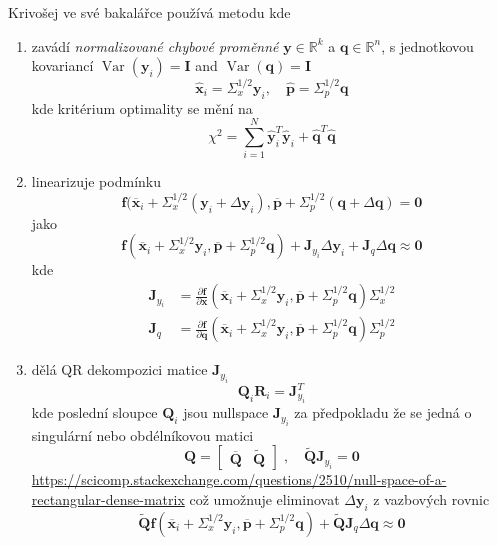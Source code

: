 \documentclass{article}
\begin{document}
	Krivošej ve své bakalářce používá metodu kde
	\begin{enumerate}
		\item zavádí \emph{normalizované chybové proměnné} $\bm{y} \in \mathbb{R}^{k}$ a $\bm{q} \in \mathbb{R}^{n}$, s jednotkovou kovariancí $\operatorname{Var}\left(\bm{y}_{i}\right)=\bm{I}$ and $\operatorname{Var}(\bm{q})=\bm{I}$
		$$
		\hat{\bm{x}}_{i}=\Sigma_{x}^{1 / 2} \bm{y}_{i}, \quad \hat{\bm{p}}=\Sigma_{p}^{1/2} \bm{q}
		$$
		kde kritérium optimality se mění na
		\begin{equation}
			\chi^2 = \sum_{i=1}^N \bm{\hat{y}}_i^T \bm{\hat{y}}_i + \bm{\hat{q}}^T \bm{\hat{q}} 
		\end{equation}
		\item linearizuje podmínku
		\begin{equation}
			\bm{f}(\bm{\overline{x}}_i+\Sigma_{x}^{1/2}(\bm{y}_i+\Delta\bm{y}_i),\bm{\overline{p}}+\Sigma_{p}^{1/2}(\bm{q}+\Delta\bm{q}) = \bm{0}
		\end{equation}
		jako
		\begin{equation}
			\bm{f}(\bm{\overline{x}}_i+\Sigma_{x}^{1/2}\bm{y}_i,\bm{\overline{p}}+\Sigma_{p}^{1/2}\bm{q}) + \bm{J}_{y_i} \Delta\bm{y}_i + \bm{J}_q \Delta\bm{q} \approx \bm{0}
		\end{equation}
		kde
		\begin{align}
			\bm{J}_{y_i} &= \frac{\partial\bm{f}}{\partial\bm{x}}(\bm{\overline{x}}_i+\Sigma_{x}^{1/2}\bm{y}_i,\bm{\overline{p}}+\Sigma_{p}^{1/2}\bm{q}) \Sigma_{x}^{1/2} \\
			\bm{J}_q &= \frac{\partial\bm{f}}{\partial\bm{q}}(\bm{\overline{x}}_i+\Sigma_{x}^{1/2}\bm{y}_i,\bm{\overline{p}}+\Sigma_{p}^{1/2}\bm{q}) \Sigma_{p}^{1/2}
		\end{align}
		\item dělá QR dekompozici matice $\bm{J}_{y_i}$
		\begin{equation}
			\bm{Q}_i \bm{R}_i = \bm{J}_{y_i}^T
		\end{equation}
		kde poslední sloupce $\bm{Q}_i$ jsou nullspace $\bm{J}_{y_i}$ za předpokladu že se jedná o singulární nebo obdélníkovou matici
		\begin{equation}
			\bm{Q}
			=
			\begin{bmatrix}
				\bm{\overline{Q}} & \bm{\widetilde{Q}}
			\end{bmatrix}
			\;,\quad 
			\bm{\widetilde{Q}} \bm{J}_{y_i} = \bm{0}
		\end{equation}
		\url{https://scicomp.stackexchange.com/questions/2510/null-space-of-a-rectangular-dense-matrix}
		což umožnuje eliminovat $\Delta\bm{y}_i$ z vazbových rovnic
		\begin{equation}
		\bm{\widetilde{Q}} \bm{f}(\bm{\overline{x}}_i+\Sigma_{x}^{1/2}\bm{y}_i,\bm{\overline{p}}+\Sigma_{p}^{1/2}\bm{q}) + \bm{\widetilde{Q}} \bm{J}_q \Delta\bm{q} \approx \bm{0}
		\end{equation}
	\end{enumerate}
\end{document}
